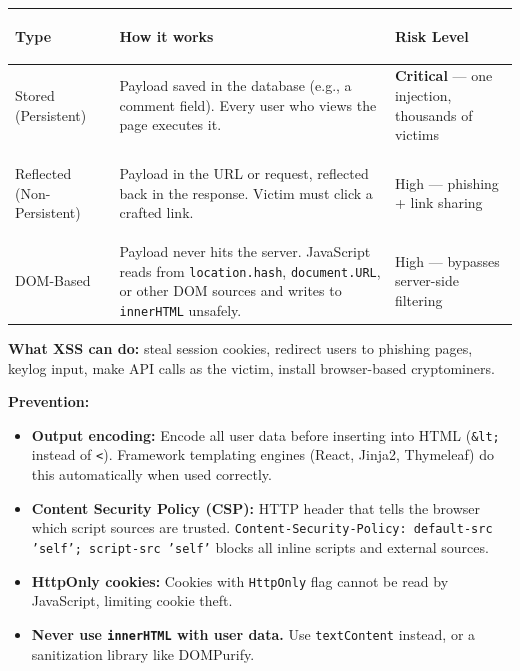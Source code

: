 \documentclass[11pt, letterpaper]{article}
\begin{document}
\noindent
{\renewcommand{\arraystretch}{1.6}
\begin{tabularx}{\textwidth}{>{\bfseries\raggedright\arraybackslash}p{3cm}
                              >{\raggedright\arraybackslash}X
                              >{\raggedright\arraybackslash}p{3.2cm}}
\toprule
\rowcolor{tableheaderred}
\textbf{Type} & \textbf{How it works} & \textbf{Risk Level} \\
\midrule
\rowcolor{rowRe} Stored (Persistent) & Payload saved in the database (e.g., a comment field). Every user who views the page executes it. & \textbf{Critical} --- one injection, thousands of victims \\
\rowcolor{rowA}  Reflected (Non-Persistent) & Payload in the URL or request, reflected back in the response. Victim must click a crafted link. & High --- phishing + link sharing \\
\rowcolor{rowRe} DOM-Based & Payload never hits the server. JavaScript reads from \texttt{location.hash}, \texttt{document.URL}, or other DOM sources and writes to \texttt{innerHTML} unsafely. & High --- bypasses server-side filtering \\
\bottomrule
\end{tabularx}}

\vspace{4pt}
\textbf{What XSS can do:} steal session cookies, redirect users to phishing pages, keylog input, make API calls as the victim, install browser-based cryptominers.

\textbf{Prevention:}
\begin{itemize}[noitemsep]
  \item \textbf{Output encoding:} Encode all user data before inserting into HTML (\texttt{\&lt;} instead of \texttt{<}). Framework templating engines (React, Jinja2, Thymeleaf) do this automatically when used correctly.
  \item \textbf{Content Security Policy (CSP):} HTTP header that tells the browser which script sources are trusted. \texttt{Content-Security-Policy: default-src 'self'; script-src 'self'} blocks all inline scripts and external sources.
  \item \textbf{HttpOnly cookies:} Cookies with \texttt{HttpOnly} flag cannot be read by JavaScript, limiting cookie theft.
  \item \textbf{Never use \texttt{innerHTML} with user data.} Use \texttt{textContent} instead, or a sanitization library like DOMPurify.
\end{itemize}
\end{document}
